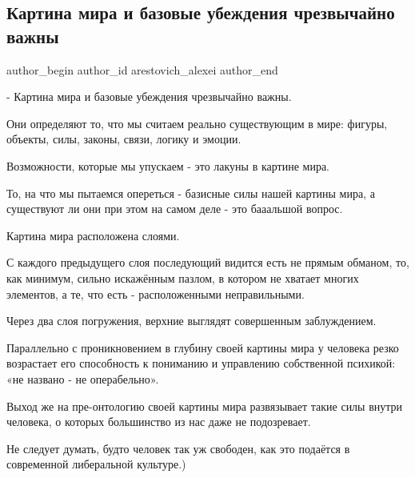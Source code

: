  
 
 
 
 
 
\subsection{Картина мира и базовые убеждения чрезвычайно важны}
\label{sec:27_01_2022.fb.arestovich_alexei.1.kartina_mira}
 
\ifcmt
 author_begin
   author_id arestovich_alexei
 author_end
\fi

- Картина мира и базовые убеждения чрезвычайно важны.

Они определяют то, что мы считаем реально существующим в мире: фигуры, объекты,
силы, законы, связи, логику и эмоции.

Возможности, которые мы упускаем - это лакуны в картине мира.


То, на что мы пытаемся опереться - базисные силы нашей картины мира, а
существуют ли они при этом на самом деле - это бааальшой вопрос.

Картина мира расположена слоями.

С каждого предыдущего слоя последующий видится есть не прямым обманом, то, как
минимум, сильно искажённым пазлом, в котором не хватает многих элементов, а те,
что есть - расположенными неправильными.

Через два слоя погружения, верхние выглядят совершенным заблуждением.

Параллельно с проникновением в глубину своей картины мира у человека резко
возрастает его способность к пониманию и управлению собственной психикой: «не
названо - не операбельно».

Выход же на пре-онтологию своей картины мира развязывает такие силы внутри
человека, о которых большинство из нас даже не подозревает.

Не следует думать, будто человек так уж свободен, как это подаётся в
современной либеральной культуре.)

